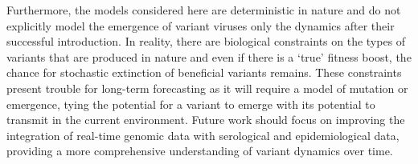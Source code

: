 \documentclass[11pt,oneside,letterpaper]{article}
\begin{document}
Furthermore, the models considered here are deterministic in nature and do not explicitly model the emergence of variant viruses only the dynamics after their successful introduction.
In reality, there are biological constraints on the types of variants that are produced in nature and even if there is a `true' fitness boost, the chance for stochastic extinction of beneficial variants remains.
These constraints present trouble for long-term forecasting as it will require a model of mutation or emergence, tying the potential for a variant to emerge with its potential to transmit in the current environment.
Future work should focus on improving the integration of real-time genomic data with serological and epidemiological data, providing a more comprehensive understanding of variant dynamics over time.



%

\end{document}

